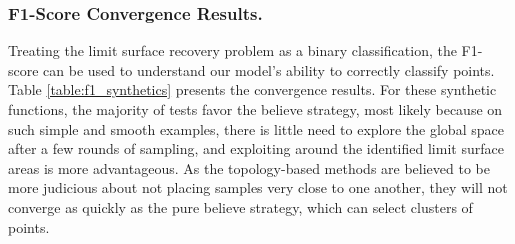 \subsubsection{F1-Score Convergence Results.}
Treating the limit surface recovery problem as a binary classification, the F1-score can be used to understand our model's ability to correctly classify points.
%
Table \ref{table:f1_synthetics} presents the convergence results.
For these synthetic functions, the majority of tests favor the believe strategy, most likely because on such simple and smooth examples, there is little need to explore the global space after a few rounds of sampling, and exploiting around the identified limit surface areas is more advantageous.
%
As the topology-based methods are believed to be more judicious about not placing samples very close to one another, they will not converge as quickly as the pure believe strategy, which can select clusters of points.

